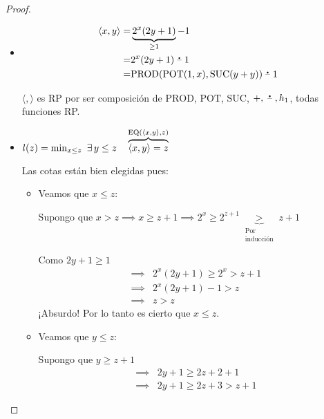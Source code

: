 \begin{proof} \phantom{.}

    \begin{itemize}
        \item 
            \begin{align*}
                \langle x,y \rangle =& \underbrace{2^x (2y+1)}_{\geq 1} - 1 \\
                =& 2^x (2y+1) \;\accentset{\mbox{\large\bfseries .}}{\text{--}}\; 1 \\
                =& \mathrm{PROD}( \mathrm{POT} (1,x), \mathrm{SUC}(y+y))
                \;\accentset{\mbox{\large\bfseries .}}{\text{--}}\; 1
            \end{align*}

            $\langle , \rangle$ es RP por ser composición de 
            $\mathrm{PROD}$, $\mathrm{POT}$,
            $\mathrm{SUC}$, $+, \;\accentset{\mbox{\large\bfseries .}}{\text{--}}\;, h_1$, todas funciones RP.

        \item $l(z) = \min_{x\leq z}{~ \exists \, y \leq z \quad
                \overbrace{\langle x, y \rangle=z}^{%
            \mathrm{EQ}(\langle x, y \rangle,z)}}$

                Las cotas están bien elegidas pues:
                \begin{itemize}
                    \item Veamos que $x \leq z$:

                    Supongo que $x > z \implies x \geq z + 1 
                    \implies 2^x \geq 2^{z+1} 
                    \underbrace{>}_{\substack{\text{Por}\\%
                    \text{inducción}}} z+1$

                    Como $2y+1 \geq 1$
                    \begin{align*}
                        \implies& 2^x (2y+1) \geq 2^x > z+1 \\
                        \implies& 2^x(2y+1) - 1 > z \\
                        \implies& z > z
                    \end{align*}
                    ¡Absurdo! Por lo tanto es cierto que $x \leq z$.

                    \item Veamos que $y \leq z$:

                    Supongo que $y\geq z + 1$
                    \begin{align*}
                        \implies& 2y+1 \geq 2z+2+1 \\
                        \implies& 2y+1 \geq 2z+3 > z+1
                    \end{align*}


\end{itemize}
\end{itemize}
\end{proof}
